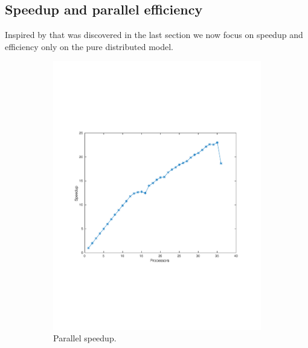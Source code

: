 \subsection*{Speedup and parallel efficiency}
Inspired by that was discovered in the last section we now focus on speedup and efficiency only on the pure distributed model.
\begin{figure}
        \centering
        \begin{subfigure}[b]{0.45\textwidth}
			\includegraphics[width=\textwidth]{./figures/speedup}
			\caption{Parallel speedup.}
			\label{fig:speedup}
        \end{subfigure}
        ~ %
        \begin{subfigure}[b]{0.45\textwidth}

\end{subfigure}
\end{figure}

